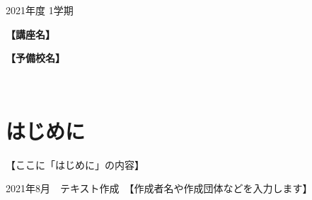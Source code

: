\documentclass[upLaTeX,dvipdfmx,b5j,openany,autodetect-engine,dvipdfmx-if-dvi,ja=standard,11pt]{jsbook}
\begin{document}


\thispagestyle{empty}

\hrulefill%

\vspace{5mm}

\hspace*{10mm}\Large{2021年度 1学期}%

\hspace*{3mm}\dotfill%

\hspace*{5mm}\Huge{{\bf 【講座名】}}%
\begin{flushright}
\LARGE{}%
\end{flushright}

\vfill

\begin{flushright}
\Large{{\bf 【予備校名】}}
\end{flushright}

\hrulefill%

\normalsize%
\restoregeometry%

\newpage
\thispagestyle{empty}


~
\newpage

\setcounter{page}{1}




\chapter*{はじめに}

【ここに「はじめに」の内容】

\vspace{10mm}

\begin{flushright}
2021年8月　テキスト作成　【作成者名や作成団体などを入力します】
\end{flushright}
\end{document}
